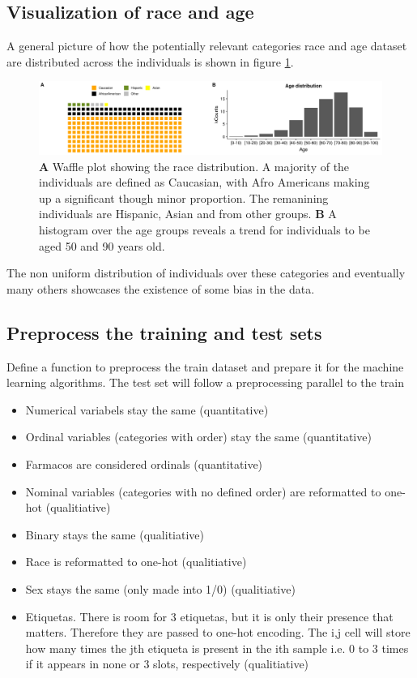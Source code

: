 \documentclass{article}\usepackage[]{graphicx}\usepackage[]{color}
\begin{document}
\subsection{Visualization of race and age}
A general picture of how the potentially relevant categories race and age dataset are distributed across the individuals is shown in figure \ref{fig:categories}.

  
\begin{figure}[!h]
\includegraphics[width=\textwidth]{plots/visualize_categories.png}
\caption{\textbf{A} Waffle plot showing the race distribution. A majority of the individuals are defined as Caucasian, with Afro Americans making up a significant though minor proportion. The remanining individuals are Hispanic, Asian and from other groups. \textbf{B} A histogram over the age groups reveals a trend for individuals to be aged 50 and 90 years old.}
\label{fig:categories}
\end{figure}
  
The non uniform distribution of individuals over these categories and eventually many others showcases the existence of some bias in the data.

\subsection{Preprocess the training and test sets}

Define a function to preprocess the train dataset and prepare it for the machine learning algorithms. The test set will follow a preprocessing parallel to the train

\begin{itemize}
\item Numerical variabels stay the same (quantitative)
\item Ordinal variables (categories with order) stay the same (quantitative)
\item Farmacos are considered ordinals (quantitative)
\item Nominal variables (categories with no defined order) are reformatted to one-hot (qualitiative)
\item Binary stays the same (qualitiative)
\item Race is reformatted to one-hot (qualitiative)
\item Sex stays the same (only made into 1/0) (qualitiative)
\item Etiquetas. There is room for 3 etiquetas, but it is only their presence that matters. Therefore they are passed to one-hot encoding. The i,j cell will store how many times the jth etiqueta is present in the ith sample i.e. 0 to 3 times if it appears in none or 3 slots, respectively (qualitiative)
\end{itemize}
\end{document}
